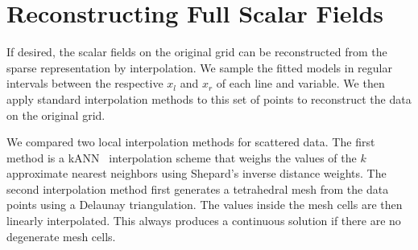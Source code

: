 \section{Reconstructing Full Scalar Fields} %
\label{sec:reconstruction}
%
If desired, the scalar fields on the original grid can be reconstructed from the
sparse representation by interpolation.
%
We sample the fitted models in regular intervals between the respective $x_l$
and $x_r$ of each line and variable.
%
We then apply standard interpolation methods to this set of points to
reconstruct the data on the original grid.
%

%

%
We compared two local interpolation methods for scattered data.
%
The first method is a \ac{kANN}~\cite{Arya1998} interpolation scheme that weighs
the values of the $k$ approximate nearest neighbors using Shepard's inverse
distance weights.
%
%
%
The second interpolation method first generates a tetrahedral mesh from the data
points using a Delaunay triangulation.
%
The values inside the mesh cells are then linearly interpolated.
%
This always produces a continuous solution if there are no degenerate mesh
cells.
%

